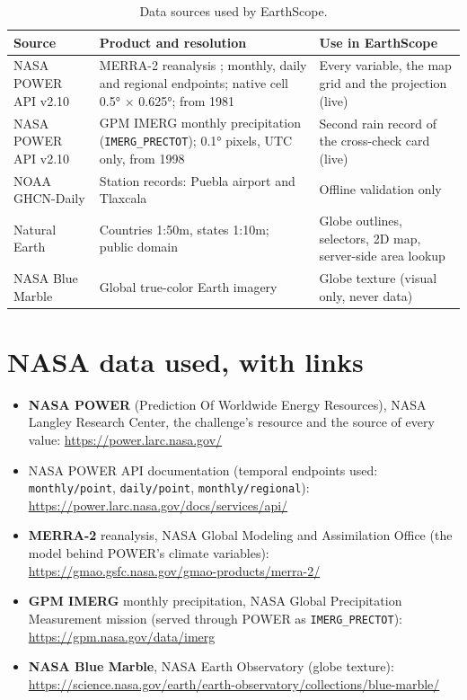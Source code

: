 \documentclass[12pt, oneside, openany]{report}
\begin{document}
\begin{table}[H]
\centering
\caption{Data sources used by EarthScope.}
\label{tab:sources}
\small
\begin{tabularx}{\linewidth}{@{}>{\raggedright\arraybackslash}p{3.3cm}>{\raggedright\arraybackslash}p{3.6cm}X@{}}
\toprule
\textbf{Source} & \textbf{Product and resolution} & \textbf{Use in EarthScope} \\
\midrule
NASA POWER API v2.10 \cite{nasapower} & MERRA-2 reanalysis \cite{gelaro2017merra2}; monthly, daily and regional endpoints; native cell \ang{0.5} $\times$ \ang{0.625}; from 1981 & Every variable, the map grid and the projection (live) \\
NASA POWER API v2.10 & GPM IMERG monthly precipitation \cite{huffman2020imerg} (\texttt{IMERG\_PRECTOT}); \ang{0.1} pixels, UTC only, from 1998 & Second rain record of the cross-check card (live) \\
NOAA GHCN-Daily \cite{ghcnd} & Station records: Puebla airport and Tlaxcala & Offline validation only \\
Natural Earth \cite{naturalearth} & Countries 1:50m, states 1:10m; public domain & Globe outlines, selectors, 2D map, server-side area lookup \\
NASA Blue Marble \cite{bluemarble} & Global true-color Earth imagery & Globe texture (visual only, never data) \\
\bottomrule
\end{tabularx}
\end{table}

\section{NASA data used, with links}

\begin{itemize}[leftmargin=*]
    \item \textbf{NASA POWER} (Prediction Of Worldwide Energy Resources), NASA Langley Research Center, the challenge's resource and the source of every value: \url{https://power.larc.nasa.gov/}
    \item NASA POWER API documentation (temporal endpoints used: \texttt{monthly/point}, \texttt{daily/point}, \texttt{monthly/regional}): \url{https://power.larc.nasa.gov/docs/services/api/}
    \item \textbf{MERRA-2} reanalysis, NASA Global Modeling and Assimilation Office (the model behind POWER's climate variables): \url{https://gmao.gsfc.nasa.gov/gmao-products/merra-2/}
    \item \textbf{GPM IMERG} monthly precipitation, NASA Global Precipitation Measurement mission (served through POWER as \texttt{IMERG\_PRECTOT}): \url{https://gpm.nasa.gov/data/imerg}
    \item \textbf{NASA Blue Marble}, NASA Earth Observatory (globe texture): \url{https://science.nasa.gov/earth/earth-observatory/collections/blue-marble/}
\end{itemize}
\end{document}
